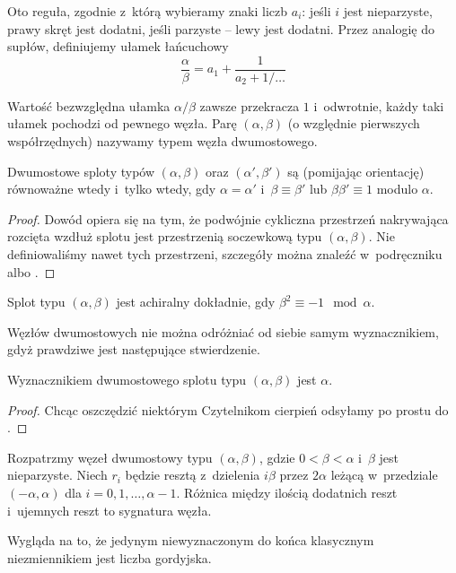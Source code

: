 
Oto reguła, zgodnie z~którą wybieramy znaki liczb $a_i$:
jeśli $i$ jest nieparzyste, prawy skręt jest dodatni, jeśli parzyste -- lewy jest dodatni.
Przez analogię do supłów, definiujemy ułamek łańcuchowy
\[
	\frac \alpha \beta = a_1 + \frac{1}{a_2 + 1/\ldots}
\]

Wartość bezwzględna ułamka $\alpha/\beta$ zawsze przekracza $1$ i~odwrotnie, każdy taki ułamek pochodzi od pewnego węzła.
Parę $(\alpha, \beta)$ (o względnie pierwszych współrzędnych) nazywamy typem węzła dwumostowego.

\begin{proposition}
\label{prp:tangle_equivalence}
	Dwumostowe sploty typów $(\alpha, \beta)$ oraz $(\alpha', \beta')$ są (pomijając orientację) równoważne wtedy i~tylko wtedy, gdy $\alpha = \alpha'$ i~$\beta \equiv \beta'$ lub $\beta \beta'\equiv 1$ modulo $\alpha$.
\end{proposition}

\begin{proof}
	Dowód opiera się na tym, że podwójnie cykliczna przestrzeń nakrywająca rozcięta wzdłuż splotu jest przestrzenią soczewkową typu $(\alpha, \beta)$.
	Nie definiowaliśmy nawet tych przestrzeni, szczegóły można znaleźć w~podręczniku \cite{murasugi96} albo \cite{schubert56}.
\end{proof}

\begin{proposition}
\label{prp:chiral_tangles}
	Splot typu $(\alpha, \beta)$ jest achiralny dokładnie, gdy $\beta^2 \equiv -1 \mod \alpha$.
\end{proposition}

Węzłów dwumostowych nie można odróżniać od siebie samym wyznacznikiem, gdyż prawdziwe jest następujące stwierdzenie.

\begin{proposition}
\label{prp:tangle_determinant}
	Wyznacznikiem dwumostowego splotu typu $(\alpha, \beta)$ jest $\alpha$.
\end{proposition}

\begin{proof}
	Chcąc oszczędzić niektórym Czytelnikom cierpień odsyłamy po prostu do \cite{schubert56}.
\end{proof}

\begin{proposition}
\label{prp:tangle_signature}
	Rozpatrzmy węzeł dwumostowy typu $(\alpha, \beta)$, gdzie $0 < \beta < \alpha$ i~$\beta$ jest nieparzyste.
	Niech $r_i$ będzie resztą z~dzielenia $i\beta$ przez $2\alpha$ leżącą w~przedziale $(-\alpha, \alpha)$ dla $i = 0, 1, \ldots, \alpha - 1$.
	Różnica między ilością dodatnich reszt i~ujemnych reszt to sygnatura węzła.
\end{proposition}

Wygląda na to, że jedynym niewyznaczonym do końca klasycznym niezmiennikiem jest liczba gordyjska.


